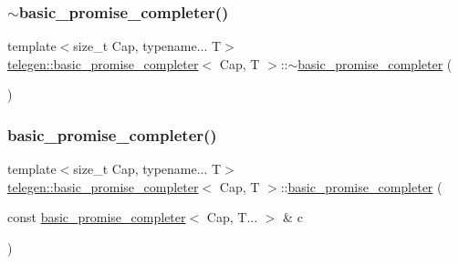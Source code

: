 \mbox{\label{classtelegen_1_1basic__promise__completer_afd43d4a7da2cd9da6b6ad4e56d6b9cff}} 
\subsubsection{\texorpdfstring{$\sim$basic\+\_\+promise\+\_\+completer()}{~basic\_promise\_completer()}}
{\footnotesize\ttfamily template$<$size\+\_\+t Cap, typename... T$>$ \\
\hyperlink{classtelegen_1_1basic__promise__completer}{telegen\+::basic\+\_\+promise\+\_\+completer}$<$ Cap, T $>$\+::$\sim$\hyperlink{classtelegen_1_1basic__promise__completer}{basic\+\_\+promise\+\_\+completer} (\begin{DoxyParamCaption}{ }\end{DoxyParamCaption})\hspace{0.3cm}{\ttfamily [inline]}}

\mbox{\label{classtelegen_1_1basic__promise__completer_a86975693f5fb59c5feec43a82fdd0426}} 
\subsubsection{\texorpdfstring{basic\+\_\+promise\+\_\+completer()}{basic\_promise\_completer()}\hspace{0.1cm}{\footnotesize\ttfamily [2/3]}}
{\footnotesize\ttfamily template$<$size\+\_\+t Cap, typename... T$>$ \\
\hyperlink{classtelegen_1_1basic__promise__completer}{telegen\+::basic\+\_\+promise\+\_\+completer}$<$ Cap, T $>$\+::\hyperlink{classtelegen_1_1basic__promise__completer}{basic\+\_\+promise\+\_\+completer} (\begin{DoxyParamCaption}\item[{const \hyperlink{classtelegen_1_1basic__promise__completer}{basic\+\_\+promise\+\_\+completer}$<$ Cap, T... $>$ \&}]{c }\end{DoxyParamCaption})\hspace{0.3cm}{\ttfamily [delete]}}

